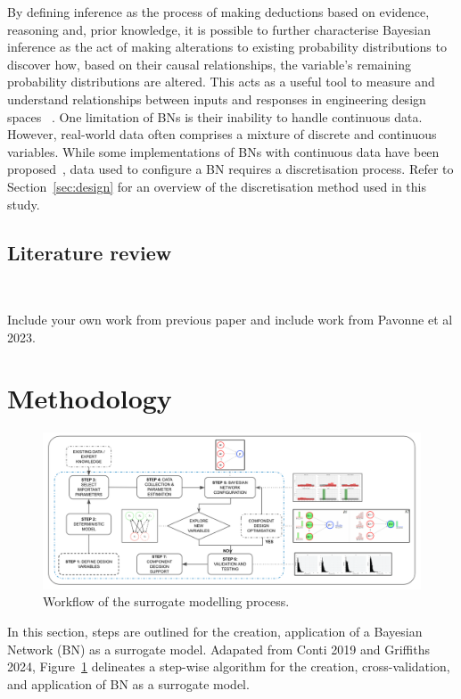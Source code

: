 \documentclass[journal]{IEEEtran}
\begin{document}
By defining inference as the process of making deductions based on evidence, reasoning and, prior knowledge, it is possible to further characterise Bayesian inference as the act of making alterations to existing probability distributions to discover how, based on their causal relationships, the variable's remaining probability distributions are altered. This acts as a useful tool to measure and understand relationships between inputs and responses in engineering design spaces~ \cite{Koller2009ProbabilisticTechniques}. One limitation of BNs is their inability to handle continuous data. However, real-world data often comprises a mixture of discrete and continuous variables. While some implementations of BNs with continuous data have been proposed~\cite{Cobb2007BayesianVariables,Chen2017LearningData, Li2018EfficientVariables}, data used to configure a BN requires a discretisation process. Refer to Section~\ref{sec:design} for an overview of the discretisation method used in this study.

\subsection{Literature review}~\label{sec:background}

Include your own work from previous paper and include work from Pavonne et al 2023. 

\section{Methodology}\label{sec:methodology}

\begin{figure}[t]
    \centering
    \includegraphics[width=\textwidth]{figures/workflow_v3.png}
    \caption{Workflow of the surrogate modelling process.}\label{fig:workflow}
\end{figure}

In this section, steps are outlined for the creation, application of a Bayesian Network (BN) as a surrogate model. Adapated from Conti 2019 and Griffiths 2024, Figure~\ref{fig:workflow} delineates a step-wise algorithm for the creation, cross-validation, and application of BN as a surrogate model. 
\end{document}

